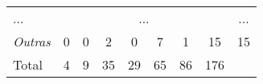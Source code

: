 \begin{table}[ht!]
{\begin{tabular}{l|ccccccc|c}
            ...                                                                                                   & \multicolumn{7}{c|}{...}                         & \multicolumn{1}{c}{...}                                                                                                                                                                                                         \\
            \textit{Outras}                                                                                       & 0                                                & 0                         & \cellcolor[HTML]{FFFCF6}2  & 0                          & \cellcolor[HTML]{FFF5E1}7  & \cellcolor[HTML]{FFFEFB}1  & \cellcolor[HTML]{FFECC7}15 & 15                                              \\ \hline
            Total                                                                                                 & 4                                                & 9                         & 35                         & 29                         & 65                         & 86                         & 176                        &                                                 \\ \hline
        \end{tabular}%
    }
\end{table}